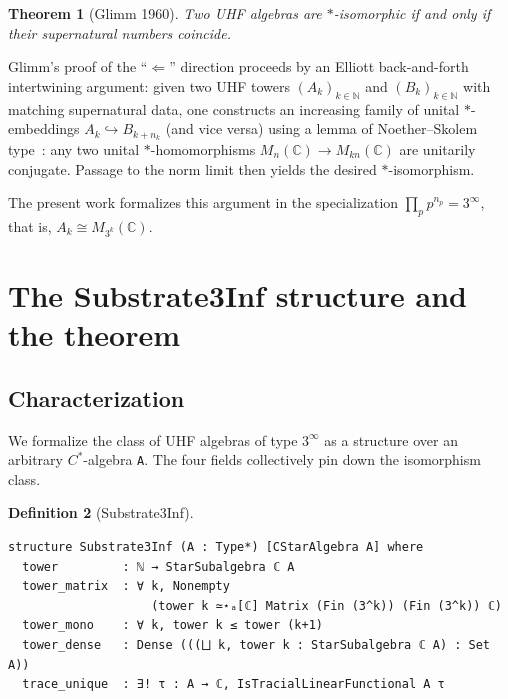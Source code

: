 \documentclass[11pt,a4paper]{article}
\theoremstyle{plain}
\newtheorem{theorem}{Theorem}[section]
\theoremstyle{definition}
\newtheorem{definition}[theorem]{Definition}
\begin{document}
\begin{theorem}[Glimm 1960]
\label{thm:glimm}
Two UHF algebras are $\ast$-isomorphic if and only if their supernatural numbers coincide.
\end{theorem}

Glimm's proof of the ``$\Leftarrow$'' direction proceeds by an Elliott back-and-forth intertwining argument: given two UHF towers $(A_k)_{k \in \mathbb{N}}$ and $(B_k)_{k \in \mathbb{N}}$ with matching supernatural data, one constructs an increasing family of unital $\ast$-embeddings $A_k \hookrightarrow B_{k+n_k}$ (and vice versa) using a lemma of Noether--Skolem type~\cite{skolem1927, noether1929}: any two unital $\ast$-homomorphisms $M_n(\mathbb{C}) \to M_{kn}(\mathbb{C})$ are unitarily conjugate. Passage to the norm limit then yields the desired $\ast$-isomorphism.

The present work formalizes this argument in the specialization $\prod_p p^{n_p} = 3^{\infty}$, that is, $A_k \cong M_{3^k}(\mathbb{C})$.

\section{The Substrate3Inf structure and the theorem}
\label{sec:substrate}

\subsection{Characterization}

We formalize the class of UHF algebras of type $3^{\infty}$ as a structure over an arbitrary $C^{\ast}$-algebra \texttt{A}. The four fields collectively pin down the isomorphism class.

\begin{definition}[Substrate3Inf]
\label{def:substrate3inf}
\begin{lstlisting}
structure Substrate3Inf (A : Type*) [CStarAlgebra A] where
  tower         : ℕ → StarSubalgebra ℂ A
  tower_matrix  : ∀ k, Nonempty
                    (tower k ≃⋆ₐ[ℂ] Matrix (Fin (3^k)) (Fin (3^k)) ℂ)
  tower_mono    : ∀ k, tower k ≤ tower (k+1)
  tower_dense   : Dense (((⨆ k, tower k : StarSubalgebra ℂ A) : Set A))
  trace_unique  : ∃! τ : A → ℂ, IsTracialLinearFunctional A τ
\end{lstlisting}
\end{definition}
\end{document}
